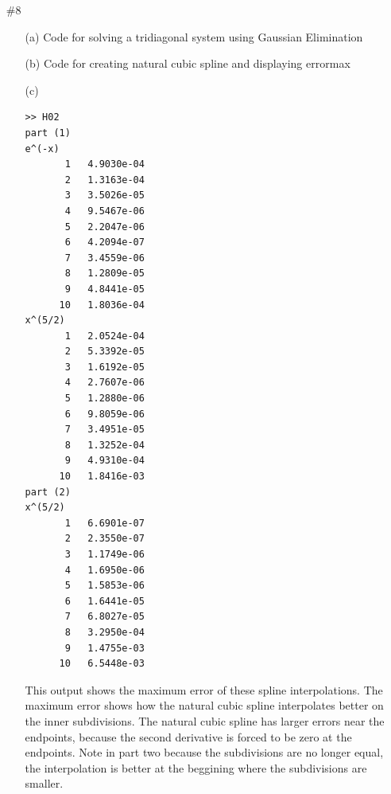 \documentclass[11pt]{article}
\begin{document}
\begin{enumerate}
    \item[\#8] %
        \begin{enumerate}
            \item[(a)] Code for solving a tridiagonal system using Gaussian Elimination
                
            \item[(b)] Code for creating natural cubic spline and displaying errormax
                
                
            \item[(c)]
        \begin{verbatim}
>> H02
part (1)
e^(-x)
       1   4.9030e-04
       2   1.3163e-04
       3   3.5026e-05
       4   9.5467e-06
       5   2.2047e-06
       6   4.2094e-07
       7   3.4559e-06
       8   1.2809e-05
       9   4.8441e-05
      10   1.8036e-04
x^(5/2)
       1   2.0524e-04
       2   5.3392e-05
       3   1.6192e-05
       4   2.7607e-06
       5   1.2880e-06
       6   9.8059e-06
       7   3.4951e-05
       8   1.3252e-04
       9   4.9310e-04
      10   1.8416e-03
part (2)
x^(5/2)
       1   6.6901e-07
       2   2.3550e-07
       3   1.1749e-06
       4   1.6950e-06
       5   1.5853e-06
       6   1.6441e-05
       7   6.8027e-05
       8   3.2950e-04
       9   1.4755e-03
      10   6.5448e-03
        \end{verbatim}
        This output shows the maximum error of these spline interpolations.
        The maximum error shows how the natural cubic spline interpolates
        better on the inner subdivisions.
        The natural cubic spline has larger errors near the endpoints, because
        the second derivative is forced to be zero at the endpoints.
        Note in part two because the subdivisions are no longer equal, the
        interpolation is better at the beggining where the subdivisions are smaller.
        \end{enumerate}
\end{enumerate}
\end{document}
